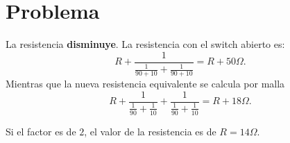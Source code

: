 \section*{Problema}

La resistencia \textbf{disminuye}. La resistencia con el switch abierto es:
	$$ R + \frac{1}{\frac{1}{90 + 10} + \frac{1}{90 + 10}} = R + 50\Omega . $$
	Mientras que la nueva resistencia equivalente se calcula por malla
	$$ R + \frac{1}{\frac{1}{90} + \frac{1}{10}} + \frac{1}{\frac{1}{90} + \frac{1}{10}} = R + 18\Omega . $$

Si el factor es de $2$, el valor de la resistencia es de $R = 14\Omega$.






